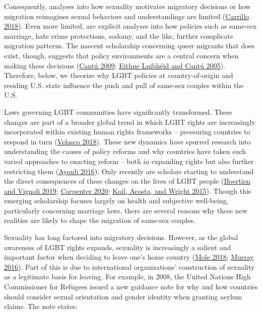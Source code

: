 \documentclass[
  11pt,
]{article}
\begin{document}
Consequently, analyses into how sexuality motivates migratory decisions or how migration reimagines sexual behaviors and understandings are limited (\protect\hyperlink{ref-carrillo_2018}{Carrillo 2018}). Even more limited, are explicit analyses into how policies such as same-sex marriage, hate crime protections, sodomy, and the like, further complicate migration patterns. The nascent scholarship concerning queer migrants that does exist, though, suggests that policy environments are a central concern when making these decisions (\protect\hyperlink{ref-cantu_2009}{Cantú 2009}; \protect\hyperlink{ref-luibheid_2005}{Eithne Luibhéid and Cantú 2005}). Therefore, below, we theorize why LGBT policies at country-of-origin and residing U.S. state influence the push and pull of same-sex couples within the U.S.

Laws governing LGBT communities have significantly transformed. These changes are part of a broader global trend in which LGBT rights are increasingly incorporated within existing human rights frameworks -- pressuring countries to respond in turn (\protect\hyperlink{ref-velasco_2018}{Velasco 2018}). These new dynamics have spurred research into understanding the causes of policy reforms and why countries have taken such varied approaches to enacting reform -- both in expanding rights but also further restricting them (\protect\hyperlink{ref-ayoub_2016}{Ayoub 2016}). Only recently are scholars starting to understand the direct consequences of these changes on the lives of LGBT people (\protect\hyperlink{ref-boertien_2019}{Boertien and Vignoli 2019}; \protect\hyperlink{ref-carpenter_2020}{Carpenter 2020}; \protect\hyperlink{ref-kail_2015}{Kail, Acosta, and Wright 2015}). Though this emerging scholarship focuses largely on health and subjective well-being, particularly concerning marriage laws, there are several reasons why these new realities are likely to shape the migration of same-sex couples.

Sexuality has long factored into migratory decisions. However, as the global awareness of LGBT rights expands, sexuality is increasingly a salient and important factor when deciding to leave one's home country (\protect\hyperlink{ref-mole_2018a}{Mole 2018}; \protect\hyperlink{ref-murray_2016}{Murray 2016}). Part of this is due to international organizations' construction of sexuality as a legitimate basis for leaving. For example, in 2008, the United Nations High Commissioner for Refugees issued a new guidance note for why and how countries should consider sexual orientation and gender identity when granting asylum claims. The note states:
\end{document}
